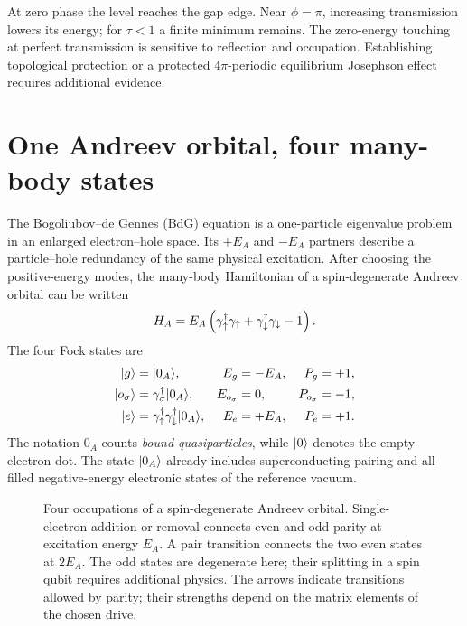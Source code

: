 At zero phase the level reaches the gap edge. Near $\phi=\pi$, increasing
transmission lowers its energy; for $\tau<1$ a finite minimum remains. The
zero-energy touching at perfect transmission is sensitive to reflection and
occupation. Establishing topological protection or a protected
$4\pi$-periodic equilibrium Josephson effect requires additional evidence.

\section{One Andreev orbital, four many-body states}\label{sec:abs-occupations}

The Bogoliubov--de Gennes (BdG) equation is a one-particle eigenvalue problem in an
enlarged electron--hole space. Its $+E_A$ and $-E_A$ partners describe a
particle--hole redundancy of the same physical excitation.
After choosing the positive-energy modes, the many-body Hamiltonian of a
spin-degenerate Andreev orbital can be written
\begin{equation}\label{eq:andreev-occupations}
 H_A=E_A\left(\gamma_{\uparrow}^\dagger\gamma_{\uparrow}+
                    \gamma_{\downarrow}^\dagger\gamma_{\downarrow}-1\right).
\end{equation}
The four Fock states are
\begin{align}
 \lvert g\rangle&=\lvert 0_A\rangle, & E_g&=-E_A, & P_g&=+1,\nonumber\\
 \lvert o_\sigma\rangle&=\gamma_\sigma^\dagger\lvert 0_A\rangle, & E_{o_\sigma}&=0, & P_{o_\sigma}&=-1,\nonumber\\
 \lvert e\rangle&=\gamma_{\uparrow}^\dagger\gamma_{\downarrow}^\dagger\lvert 0_A\rangle, & E_e&=+E_A, & P_e&=+1.
\end{align}
The notation $0_A$ counts \emph{bound quasiparticles}, while $\lvert 0\rangle$ denotes the empty
electron dot. The state $\lvert 0_A\rangle$ already includes superconducting
pairing and all filled negative-energy electronic states of the reference vacuum.

\begin{figure}[htb]
\centering{}
\caption{Four occupations of a spin-degenerate Andreev orbital. Single-electron
addition or removal connects even and odd parity at excitation energy $E_A$.
A pair transition connects the two even states at $2E_A$. The odd states are
degenerate here; their splitting in a spin qubit requires additional physics.
The arrows indicate transitions allowed by parity; their strengths depend on the
matrix elements of the chosen drive.}
\label{fig:primer-occupations}
\end{figure}

